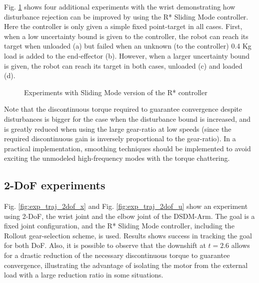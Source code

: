 Fig. \ref{fig:rob} shows four additional experiments with the wrist demonstrating how disturbance rejection can be improved by using the  R* Sliding Mode controller. Here the controller is only given a simple fixed point-target in all cases. First, when a low uncertainty bound is given to the controller, the robot can reach its target when unloaded (a) but failed when an unknown (to the controller) 0.4 Kg load is added to the end-effector (b). However, when a larger uncertainty bound is given, the robot can reach its target in both cases, unloaded (c) and loaded (d). 

\begin{figure}[htp]
        \centering
				\hspace{-10pt}
				\hspace{-5pt}
				\hspace{-5pt}
				\hspace{-5pt}
        \caption{Experiments with Sliding Mode version of the R* controller }
				\label{fig:rob}
\end{figure}

Note that the discontinuous torque required to guarantee convergence despite disturbances is bigger for the case when the disturbance bound is increased, and is greatly reduced when using the large gear-ratio at low speeds (since the required discontinuous gain is inversely proportional to the gear-ratio). In a practical implementation, smoothing techniques should be implemented to avoid exciting the unmodeled high-frequency modes with the torque chattering.

\subsection{2-DoF experiments}

Fig. \ref{fig:exp_traj_2dof_x} and Fig. \ref{fig:exp_traj_2dof_u} show an experiment using 2-DoF, the wrist joint and the elbow joint of the DSDM-Arm. The goal is a fixed joint configuration, and the R* Sliding Mode controller, including the Rollout gear-selection scheme, is used. Results shows success in tracking the goal for both DoF. Also, it is possible to observe that the downshift at $t=2.6$ allows for a drastic reduction of the necessary discontinuous torque to guarantee convergence, illustrating the advantage of isolating the motor from the external load with a large reduction ratio in some situations.

